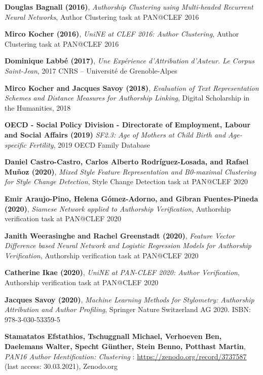 \begin{thebibliography}{9}
\textbf{Douglas Bagnall (2016)},
\textit{Authorship Clustering using Multi-headed Recurrent Neural Networks},
Author Clustering task at PAN@CLEF 2016

\textbf{Mirco Kocher (2016)},
\textit{UniNE at CLEF 2016: Author Clustering},
Author Clustering task at PAN@CLEF 2016

\textbf{Dominique Labbé (2017)},
\textit{Une Expérience d’Attribution d’Auteur. Le Corpus Saint-Jean},
2017 CNRS – Université de Grenoble-Alpes

\textbf{Mirco Kocher and Jacques Savoy (2018)},
\textit{Evaluation of Text Representation Schemes and Distance Measures for Authorship Linking},
Digital Scholarship in the Humanities, 2018

\textbf{OECD - Social Policy Division - Directorate of Employment, Labour and Social Affairs (2019)}
\textit{SF2.3: Age of Mothers at Child Birth and Age-specific Fertility},
2019 OECD Family Database

\textbf{Daniel Castro-Castro, Carlos Alberto Rodríguez-Losada, and Rafael Muñoz (2020)},
\textit{Mixed Style Feature Representation and B0-maximal Clustering for Style Change Detection},
Style Change Detection task at PAN@CLEF 2020

\textbf{Emir Araujo-Pino, Helena Gómez-Adorno, and Gibran Fuentes-Pineda (2020)},
\textit{Siamese Network applied to Authorship Verification},
Authorship verification task at PAN@CLEF 2020

\textbf{Janith Weerasinghe and Rachel Greenstadt (2020)},
\textit{Feature Vector Difference based Neural Network and Logistic Regression Models for Authorship Verification},
Authorship verification task at PAN@CLEF 2020

\textbf{Catherine Ikae (2020)},
\textit{UniNE at PAN-CLEF 2020: Author Verification},
Authorship verification task at PAN@CLEF 2020

\textbf{Jacques Savoy (2020)},
\textit{Machine Learning Methods for Stylometry: Authorship Attribution and Author Profiling},
Springer Nature Switzerland AG 2020. ISBN: 978-3-030-53359-5


\textbf{Stamatatos Efstathios, Tschuggnall Michael, Verhoeven Ben, Daelemans Walter, Specht Günther, Stein Benno, Potthast Martin},
\textit{PAN16 Author Identification: Clustering} : \url{https://zenodo.org/record/3737587} (last access: 30.03.2021),
Zenodo.org


\end{thebibliography}
